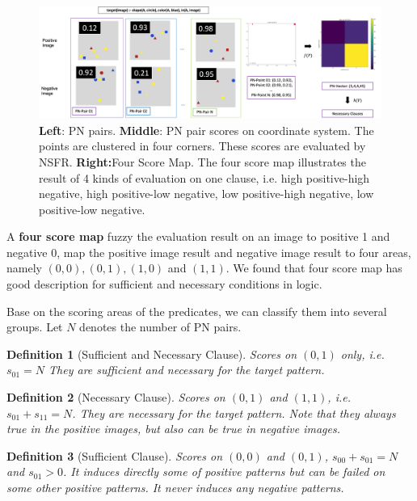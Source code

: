 \documentclass[
]{ceurart}
\newtheorem{definition}{Definition}[section]
\begin{document}
 \begin{figure}[h]
 	\centering
 	\begin{minipage}{\textwidth}
 		\includegraphics[width=\linewidth]{img/four_zone_explain.png} 
 		\caption{\textbf{Left}: PN pairs. \textbf{Middle}: PN pair scores on coordinate system. The points are clustered in four corners. These scores are evaluated by NSFR. \textbf{Right:}Four Score Map. The four score map illustrates the result of 4 kinds of evaluation on one clause, i.e. high positive-high negative, high positive-low negative, low positive-high negative, low positive-low negative. }
 		\label{fig:pn-pair}
 	\end{minipage}
 \end{figure}
 
 A \textbf{four score map} fuzzy the evaluation result on an image to positive 1 and negative 0, map the positive image result and negative image result to four areas, namely $ (0,0), (0,1), (1,0) $ and $ (1,1) $. We found that four score map has good description for sufficient and necessary conditions in logic.

Base on the scoring areas of the predicates, we can classify them into several groups. Let $ N $ denotes the number of PN pairs.

\begin{definition}[Sufficient and Necessary Clause]
	Scores on $ (0,1) $ only, i.e. $ s_{01} =N$ They are sufficient and necessary for the target pattern.
\end{definition}

\begin{definition}[Necessary Clause]
	Scores on $ (0,1) $ and $ (1,1) $, i.e. $ s_{01} + s_{11} = N $. They are necessary for the target pattern. Note that they always true in the positive images, but also can be true in negative images.
\end{definition}

\begin{definition}[Sufficient Clause]
	Scores on $ (0,0) $ and $ (0,1) $, $ s_{00}+s_{01} = N $ and $ s_{01}>0 $. It induces directly some of positive patterns but can be failed on some other positive patterns. It never induces any negative patterns.
\end{definition}
\end{document}
